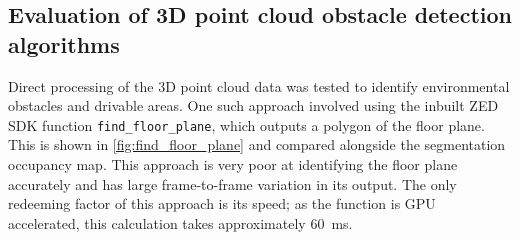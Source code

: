 \subsection{Evaluation of 3D point cloud obstacle detection algorithms}
Direct processing of the 3D point cloud data was tested to identify environmental obstacles and drivable areas.
One such approach involved using the inbuilt ZED SDK function \texttt{find\_floor\_plane},
which outputs a polygon of the floor plane.
This is shown in \cref{fig:find_floor_plane} and compared alongside the segmentation occupancy map.
This approach is very poor at identifying the floor plane accurately and has large frame-to-frame
variation in its output. The only redeeming factor of this approach is its speed;
as the function is GPU accelerated, this calculation takes approximately \SI{60}{\milli\second}.

